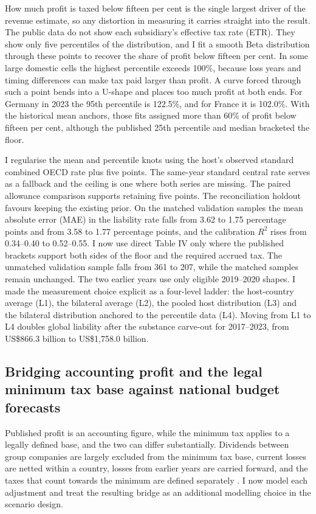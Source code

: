 \documentclass[11pt,a4paper]{article}
\newcommand{\usd}{US\$}
\begin{document}
How much profit is taxed below fifteen per cent is the single largest driver of the revenue estimate, so any distortion in measuring it carries straight into the result. The public data do not show each subsidiary's effective tax rate (ETR). They show only five percentiles of the distribution, and I fit a smooth Beta distribution through these points to recover the share of profit below fifteen per cent. In some large domestic cells the highest percentile exceeds 100\%, because loss years and timing differences can make tax paid larger than profit. A curve forced through such a point bends into a U-shape and places too much profit at both ends. For Germany in 2023 the 95th percentile is 122.5\%, and for France it is 102.0\%. With the historical mean anchors, those fits assigned more than 60\% of profit below fifteen per cent, although the published 25th percentile and median bracketed the floor.

I regularise the mean and percentile knots using the host's observed standard combined OECD rate plus five points. The same-year standard central rate serves as a fallback and the ceiling is one where both series are missing. The paired allowance comparison supports retaining five points. The reconciliation holdout favours keeping the existing prior. On the matched validation samples the mean absolute error (MAE) in the liability rate falls from 3.62 to 1.75 percentage points and from 3.58 to 1.77 percentage points, and the calibration $R^2$ rises from 0.34–0.40 to 0.52–0.55. I now use direct Table IV only where the published brackets support both sides of the floor and the required accrued tax. The unmatched validation sample falls from 361 to 207, while the matched samples remain unchanged. The two earlier years use only eligible 2019–2020 shapes. I made the measurement choice explicit as a four-level ladder: the host-country average (L1), the bilateral average (L2), the pooled host distribution (L3) and the bilateral distribution anchored to the percentile data (L4). Moving from L1 to L4 doubles global liability after the substance carve-out for 2017–2023, from \usd866.3 billion to \usd1,758.0 billion.

\subsection{Bridging accounting profit and the legal minimum tax base against national budget forecasts}

Published profit is an accounting figure, while the minimum tax applies to a legally defined base, and the two can differ substantially. Dividends between group companies are largely excluded from the minimum tax base, current losses are netted within a country, losses from earlier years are carried forward, and the taxes that count towards the minimum are defined separately \citep{hanlon2023}. I now model each adjustment and treat the resulting bridge as an additional modelling choice in the scenario design.
\end{document}
